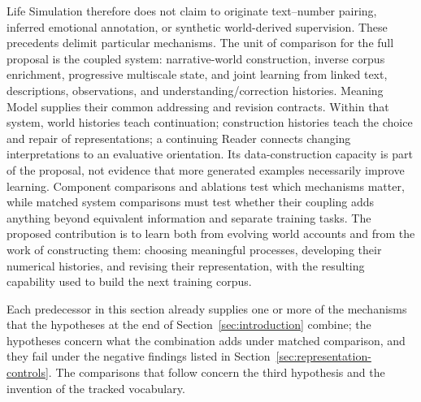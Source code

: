 \documentclass[10pt]{article}
\begin{document}
Life Simulation therefore does not claim to originate text--number pairing,
inferred emotional annotation, or synthetic world-derived supervision. These
precedents delimit particular mechanisms. The unit of comparison for the full
proposal is the coupled system: narrative-world construction, inverse corpus
enrichment, progressive multiscale state, and joint learning from linked text,
descriptions, observations, and understanding/correction histories. Meaning
Model supplies their common addressing and revision contracts. Within that
system, world histories teach continuation; construction histories teach the
choice and repair of representations; a continuing Reader connects changing
interpretations to an evaluative orientation. Its data-construction capacity
is part of the proposal, not evidence that more generated examples necessarily
improve learning. Component comparisons and ablations test which mechanisms
matter, while matched system comparisons must test whether their coupling adds
anything beyond equivalent information and separate training tasks. The
proposed contribution is to learn both from evolving world accounts and from
the work of constructing them: choosing meaningful processes, developing their
numerical histories, and revising their representation, with the resulting
capability used to build the next training corpus.

Each predecessor in this section already
supplies one or more of the mechanisms that the hypotheses at the end of
Section~\ref{sec:introduction} combine; the hypotheses concern
what the combination adds under matched comparison, and they fail under the
negative findings listed in Section~\ref{sec:representation-controls}. The
comparisons that follow concern the third hypothesis and the invention of the
tracked vocabulary.
\end{document}
